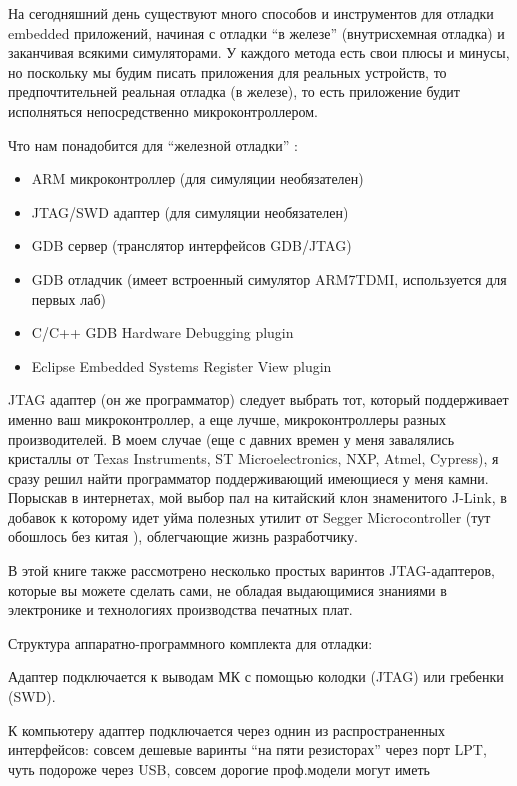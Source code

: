\label{labgdbinst}


 На сегодняшний день существуют много способов и инструментов для отладки
 embedded приложений, начиная с отладки “в железе” (внутрисхемная отладка)  и
 заканчивая всякими симуляторами. У каждого метода есть свои плюсы и минусы, но
 поскольку мы будим писать приложения для реальных устройств, то
 предпочтительней реальная отладка (в железе), то есть приложение будит
 исполняться непосредственно микроконтроллером.
 
Что нам понадобится для “железной отладки” :

\begin{itemize}
  \item 
ARM микроконтроллер (для симуляции необязателен)
  \item 
JTAG/SWD адаптер (для симуляции необязателен)
  \item 
GDB сервер (транслятор интерфейсов GDB/JTAG)
  \item 
GDB отладчик (имеет встроенный симулятор ARM7TDMI, используется для первых лаб) 
  \item 
C/C++ GDB Hardware Debugging plugin
  \item 
Eclipse Embedded Systems Register View plugin
\end{itemize}

JTAG адаптер (он же программатор) следует выбрать тот, который поддерживает
именно ваш микроконтроллер, а еще лучше, микроконтроллеры разных производителей. В моем
случае (еще с давних времен у меня завалялись кристаллы от Texas Instruments, ST
Microelectronics, NXP, Atmel, Cypress), я сразу решил найти программатор
поддерживающий имеющиеся у меня камни. Порыскав в интернетах, мой выбор пал на
китайский клон знаменитого J-Link, в добавок к которому идет уйма полезных
утилит от Segger Microcontroller (тут обошлось без китая \smiley), облегчающие
жизнь разработчику.

В этой книге также рассмотрено несколько простых варинтов JTAG-адаптеров,
которые вы можете сделать сами, не обладая выдающимися знаниями в электронике
и технологиях производства печатных плат.

\bigskip
Структура аппаратно-программного комплекта для отладки:


Адаптер подключается к выводам МК с помощью колодки (JTAG) или гребенки (SWD).

К компьютеру адаптер подключается через однин из распространенных интерфейсов:
совсем дешевые варинты ``на пяти резисторах'' через порт LPT, чуть подороже
через USB, совсем дорогие проф.модели могут иметь 
